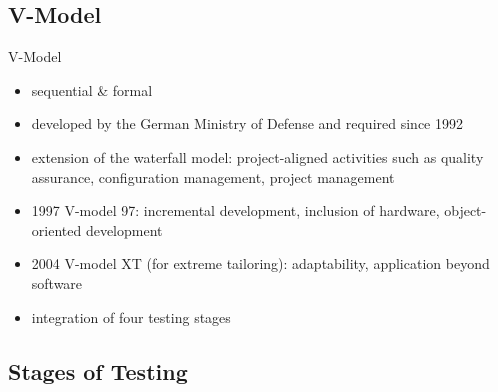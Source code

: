 
\subsection{V-Model}
\begin{frame}{\insertsubsection}
	\begin{fancycolumns}
		\begin{definition}{V-Model \mysource{\ludewiglichter}}
			\begin{itemize}
				\item sequential \& formal
				\item developed by the German Ministry of Defense  and required since 1992
				\item extension of the waterfall model: project-aligned activities such as quality assurance, configuration management, project management
				\item 1997 V-model 97: incremental development, inclusion of hardware, object-oriented development
				\item 2004 V-model XT (for extreme tailoring): adaptability, application beyond software
				\item integration of four testing stages
			\end{itemize}
		\end{definition}
		\nextcolumn
		\diagramVModel
	\end{fancycolumns}
\end{frame}

\subsection{Stages of Testing}
\begin{frame}{\insertsubsection\ \ \mytitlesource{\ludewiglichter, \sommerville}}
	\slideStagesTesting
\end{frame}


